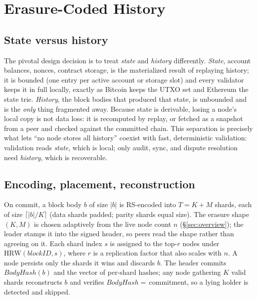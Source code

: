 \section{Erasure-Coded History}
\label{sec:history}
\subsection{State versus history}
The pivotal design decision is to treat \emph{state} and \emph{history} differently.
\emph{State}, account balances, nonces, contract storage, is the materialized result of
replaying history; it is bounded (one entry per active account or storage slot) and every
validator keeps it in full locally, exactly as Bitcoin keeps the UTXO set and Ethereum the
state trie. \emph{History}, the block bodies that produced that state, is unbounded and is
the \emph{only} thing fragmented away. Because state is derivable, losing a node's local copy
is not data loss: it is recomputed by replay, or fetched as a snapshot from a peer and checked
against the committed chain. This separation is precisely what lets ``no node stores all
history'' coexist with fast, deterministic validation: validation reads \emph{state}, which is
local; only audit, sync, and dispute resolution need \emph{history}, which is recoverable.

\subsection{Encoding, placement, reconstruction}
On commit, a block body $b$ of size $|b|$ is RS-encoded into $T=K{+}M$ shards, each of size
$\lceil |b|/K\rceil$ (data shards padded; parity shards equal size). The erasure shape
$(K,M)$ is chosen adaptively from the live node count $n$ (\S\ref{sec:overview}); the leader
stamps it into the signed header, so peers read the shape rather than agreeing on it. Each
shard index $s$ is assigned to the top-$r$ nodes under $\mathrm{HRW}(\textit{blockID},s)$,
where $r$ is a replication factor that also scales with $n$. A node persists only the shards
it wins and discards $b$. The header commits $\mathit{BodyHash}(b)$ and the vector of per-shard
hashes; any node gathering $K$ valid shards reconstructs $b$ and verifies
$\mathit{BodyHash}=\,$commitment, so a lying holder is detected and skipped.

